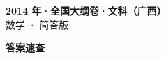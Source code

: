 \documentclass[zihao=-4, a4paper]{ctexart}
\begin{document}
\begin{center}
  {\Large\bfseries 2014 年·全国大纲卷·文科（广西）}\\[4pt]
  {\large 数学 · 简答版}
\end{center}
\medskip
{}

\clearpage
{}
\begin{center}{\Large\bfseries 答案速查}\end{center}
\medskip

\end{document}
